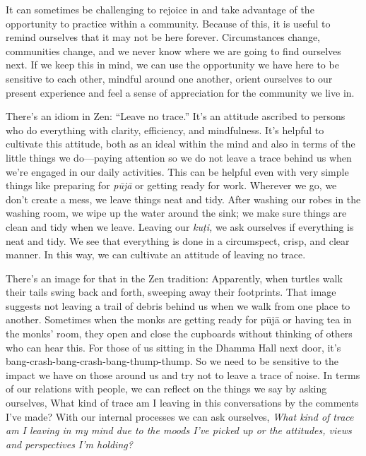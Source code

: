 It can sometimes be challenging to rejoice in and take advantage of the 
opportunity to practice within a community. Because of this, it is 
useful to remind ourselves that it may not be here forever. 
Circumstances change, communities change, and we never know where we 
are going to find ourselves next. If we keep this in mind, we can use 
the opportunity we have here to be sensitive to each other, mindful 
around one another, orient ourselves to our present experience and feel 
a sense of appreciation for the community we live in.


There's an idiom in Zen: ``Leave no trace.'' It's an attitude ascribed 
to persons who do everything with clarity, efficiency, and mindfulness. 
It's helpful to cultivate this attitude, both as an ideal within the 
mind and also in terms of the little things we do---paying attention so 
we do not leave a trace behind us when we're engaged in our daily 
activities. This can be helpful even with very simple things like 
preparing for \emph{pūjā} or getting ready for work. Wherever we go, 
we don't create a mess, we leave things neat and tidy. After washing 
our robes in the washing room, we wipe up the water around the sink; we 
make sure things are clean and tidy when we leave. Leaving our 
\emph{kuṭi,} we ask ourselves if everything is neat and tidy. We see 
that everything is done in a circumspect, crisp, and clear manner. In 
this way, we can cultivate an attitude of leaving no trace.

There's an image for that in the Zen tradition: Apparently, when 
turtles walk their tails swing back and forth, sweeping away their 
footprints. That image suggests not leaving a trail of debris behind us 
when we walk from one place to another. Sometimes when the monks are 
getting ready for pūjā or having tea in the monks' room, they open 
and close the cupboards without thinking of others who can hear this. 
For those of us sitting in the Dhamma Hall next door, it's 
bang-crash-bang-crash-bang-thump-thump. So we need to be sensitive to 
the impact we have on those around us and try not to leave a trace of 
noise. In terms of our relations with people, we can reflect on the 
things we say by asking ourselves, What kind of trace am I leaving in 
this conversations by the comments I've made? With our internal 
processes we can ask ourselves, \emph{What kind of trace am I leaving 
in my mind due to the moods I've picked up or the attitudes, views and 
perspectives I'm holding?}

